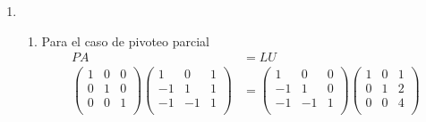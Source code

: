 \begin{enumerate}[]
\begin{enumerate}[]
        \item
        \begin{enumerate}[]
            \item Para el caso de pivoteo parcial
            \begin{align*}
                PA &= LU\\
                \begin{pmatrix}
                1 & 0 & 0 \\ 
                0 & 1 & 0 \\
                0 & 0 & 1 \\
                \end{pmatrix}
                \begin{pmatrix}
                1 & 0 & 1 \\ 
                -1 & 1 & 1 \\
                -1 & -1 & 1 \\
                \end{pmatrix} &= 
                \begin{pmatrix}
                1 & 0 & 0 \\ 
                -1 & 1 & 0 \\
                -1 & -1 & 1 \\
                \end{pmatrix}
                \begin{pmatrix}
                1 & 0 & 1 \\ 
                0 & 1 & 2 \\
                0 & 0 & 4 \\
                \end{pmatrix}
            \end{align*}
            \\
            

\end{enumerate}
\end{enumerate}
\end{enumerate}
